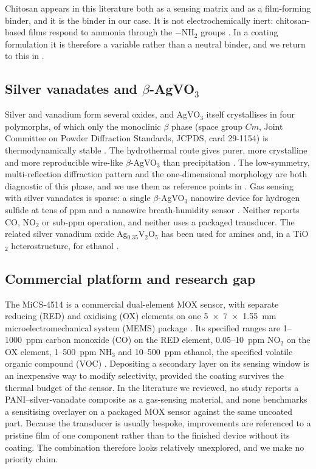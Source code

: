 \documentclass[preprint,11pt]{elsarticle}
\begin{document}
Chitosan appears in this literature both as a sensing matrix and as a film-forming binder, and it is the binder in our case. It is not electrochemically inert: chitosan-based films respond to ammonia through the $-$NH$_2$ groups \cite{saeed2024chitosansal}. In a coating formulation it is therefore a variable rather than a neutral binder, and we return to this in .

\subsection{Silver vanadates and $\beta$-AgVO$_3$}
\label{sec:lit-agvo3}
Silver and vanadium form several oxides, and AgVO$_3$ itself crystallises in four polymorphs, of which only the monoclinic $\beta$ phase (space group $Cm$, Joint Committee on Powder Diffraction Standards, JCPDS, card 29-1154) is thermodynamically stable \cite{menezes2019agvo3}. The hydrothermal route gives purer, more crystalline and more reproducible wire-like $\beta$-AgVO$_3$ than precipitation \cite{menezes2019agvo3}. The low-symmetry, multi-reflection diffraction pattern and the one-dimensional morphology are both diagnostic of this phase, and we use them as reference points in . Gas sensing with silver vanadates is sparse: a single $\beta$-AgVO$_3$ nanowire device for hydrogen sulfide at tens of ppm \cite{mai2010agvo3} and a nanowire breath-humidity sensor \cite{yan2023agvo3breath}. Neither reports CO, NO$_2$ or sub-ppm operation, and neither uses a packaged transducer. The related silver vanadium oxide Ag$_{0.35}$V$_2$O$_5$ has been used for amines \cite{fu2015agv2o5} and, in a TiO$_2$ heterostructure, for ethanol \cite{wang2016tio2agv2o5}.

\subsection{Commercial platform and research gap}
\label{sec:gap}
The MiCS-4514 is a commercial dual-element MOX sensor, with separate reducing (RED) and oxidising (OX) elements on one 5~$\times$~7~$\times$~1.55~mm microelectromechanical system (MEMS) package \cite{sgx2019mics4514}. Its specified ranges are 1--1000~ppm carbon monoxide (CO) on the RED element, 0.05--10~ppm NO$_2$ on the OX element, 1--500~ppm NH$_3$ and 10--500~ppm ethanol, the specified volatile organic compound (VOC) \cite{sgx2019mics4514}. Depositing a secondary layer on its sensing window is an inexpensive way to modify selectivity, provided the coating survives the thermal budget of the sensor. In the literature we reviewed, no study reports a PANI--silver-vanadate composite as a gas-sensing material, and none benchmarks a sensitising overlayer on a packaged MOX sensor against the same uncoated part. Because the transducer is usually bespoke, improvements are referenced to a pristine film of one component rather than to the finished device without its coating. The combination therefore looks relatively unexplored, and we make no priority claim.
\end{document}
